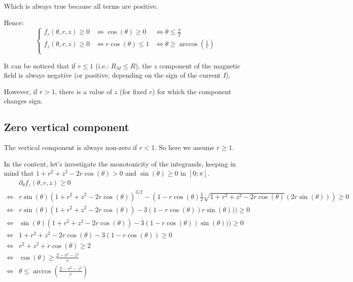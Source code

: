\documentclass[a4paper,11pt,twoside,titlepage,openright]{book}
\numberwithin{equation}{section}
\begin{document}
Which is always true because all terms are positive.

Hence:
$$
\left\{
\begin{array}{lll}
    f_r(\theta, r, z) \geq 0
    & \Leftrightarrow \cos(\theta) \geq 0
    & \Leftrightarrow \theta \leq \frac{\pi}{2}\\
    f_z(\theta, r, z) \geq 0
    & \Leftrightarrow r\cos(\theta) \leq 1
    & \Leftrightarrow \theta \geq \arccos\left(\frac{1}{r}\right)\\
\end{array}
\right.
$$

It can be noticed that if $r\leq1$ (i.e.: $R_M \leq R$), the $z$ component of
the magnetic field is always negative (or positive, depending on the sign of
the current $I$).

However, if $r > 1$, there is a value of $z$ (for fixed $r$) for which the
component changes sign.

\subsection{Zero vertical component}

The vertical component is always non-zero if $r<1$.
So here we assume $r \geq 1$.

In the context, let's investigate the monotonicity of the integrands, keeping
in mind that $1 + r^2 + z^2 - 2r\cos(\theta) > 0$ and $\sin(\theta) \geq 0$ in
$[0; \pi]$.
$$
\begin{array}{ll}
    & \partial_{\theta} f_z(\theta, r, z) \geq 0\\
    \Leftrightarrow
    & r\sin(\theta)(1 + r^2 + z^2 - 2r\cos(\theta) )^{3/2}
    - (1-r\cos(\theta)\frac{3}{2}\sqrt{1 + r^2 + z^2 -
    2r\cos(\theta)}(2r\sin(\theta))) \geq 0\\
    \Leftrightarrow
    & r\sin(\theta)(1 + r^2 + z^2 - 2r\cos(\theta))
    - 3(1-r\cos(\theta))r\sin(\theta))) \geq 0\\
    \Leftrightarrow
    & \sin(\theta)(1 + r^2 + z^2 - 2r\cos(\theta))
    - 3(1-r\cos(\theta))\sin(\theta))) \geq 0\\
    \Leftrightarrow
    & 1 + r^2 + z^2 - 2r\cos(\theta) - 3(1-r\cos(\theta)) \geq 0\\
    \Leftrightarrow
    & r^2 + z^2 + r\cos(\theta) \geq 2\\
    \Leftrightarrow
    & \cos(\theta) \geq \frac{2 - r^2 - z^2}{r}\\
    \Leftrightarrow
    & \theta \leq \arccos\left(\frac{2 - r^2 - z^2}{r}\right)\\
\end{array}
$$
\end{document}
